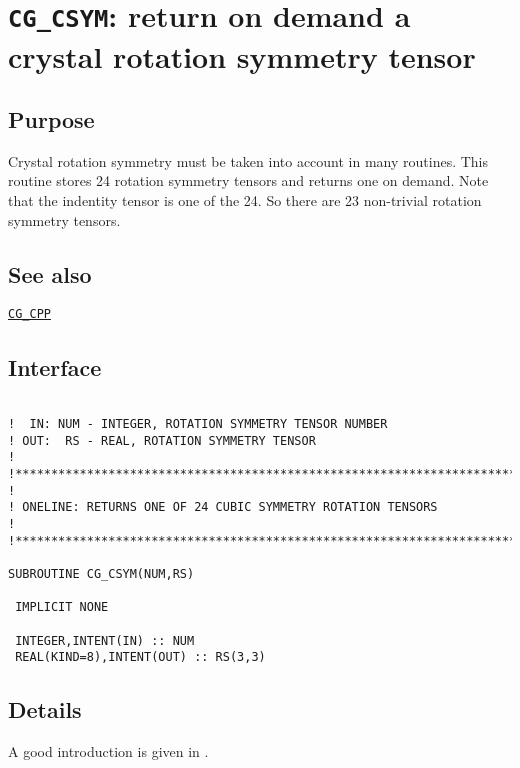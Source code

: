 \section{\texttt{CG\_CSYM}:
 return on demand a crystal rotation symmetry tensor}

\label{sec:cg_csym}

\subsection{Purpose}

Crystal rotation symmetry must be taken into
account in many routines. This routine stores
24 rotation symmetry tensors and returns one
on demand. Note that the indentity tensor is
one of the 24. So there are 23 non-trivial
rotation symmetry tensors.

\subsection{See also}

\hyperref[sec:cg_cpp]{\texttt{CG\_CPP}}

\subsection{Interface}

\begin{verbatim}

!  IN: NUM - INTEGER, ROTATION SYMMETRY TENSOR NUMBER
! OUT:  RS - REAL, ROTATION SYMMETRY TENSOR
! 
!**********************************************************************73
! 
! ONELINE: RETURNS ONE OF 24 CUBIC SYMMETRY ROTATION TENSORS
! 
!**********************************************************************73

SUBROUTINE CG_CSYM(NUM,RS)

 IMPLICIT NONE

 INTEGER,INTENT(IN) :: NUM
 REAL(KIND=8),INTENT(OUT) :: RS(3,3)

\end{verbatim}

\subsection{Details}

A good introduction is given in \cite{engler2010}.
